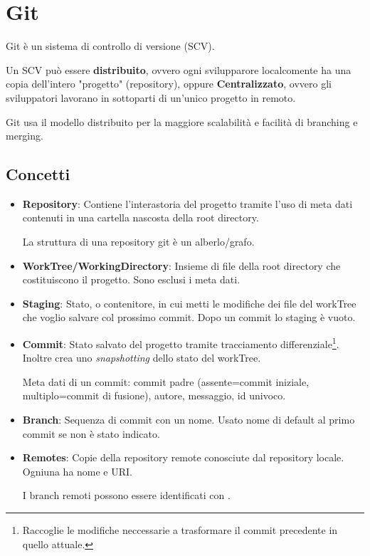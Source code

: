 \section{Git}
Git è un sistema di controllo di versione (SCV).

Un SCV può essere \textbf{distribuito}, ovvero ogni svilupparore localcomente ha una copia dell'intero "progetto" (repository), oppure \textbf{Centralizzato}, ovvero gli sviluppatori lavorano in sottoparti di un'unico progetto in remoto.

Git usa il modello distribuito per la maggiore scalabilità e facilità di branching e merging.

\subsection{Concetti}
\begin{itemize}
	\item \textbf{Repository}: Contiene l'interastoria del progetto tramite l'uso di meta dati contenuti in una cartella nascosta della root directory.

	La struttura di una repository git è un alberlo/grafo.

	\item \textbf{WorkTree/WorkingDirectory}: Insieme di file della root directory che costituiscono il progetto. Sono esclusi i meta dati.

	\item \textbf{Staging}: Stato, o contenitore, in cui metti le modifiche dei file del workTree che voglio salvare col prossimo commit. Dopo un commit lo staging è vuoto.

	\item \textbf{Commit}: Stato salvato del progetto tramite tracciamento differenziale\footnote{Raccoglie le modifiche neccessarie a trasformare il commit precedente in quello attuale.}. Inoltre crea uno \textit{snapshotting} dello stato del workTree.

	Meta dati di un commit: commit padre (assente=commit iniziale, multiplo=commit di fusione), autore, messaggio, id univoco.

	\item \textbf{Branch}: Sequenza di commit con un nome. Usato nome di default al primo commit se non è stato indicato.

	\item \textbf{Remotes}: Copie della repository remote conosciute dal repository locale. Ogniuna ha nome e URI.

	I branch remoti possono essere identificati con .
\end{itemize}

